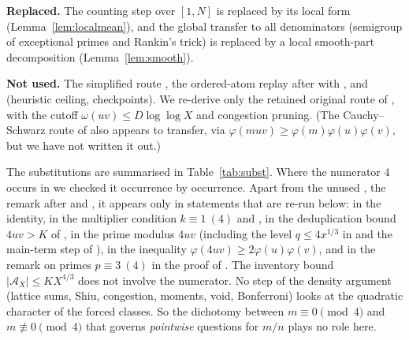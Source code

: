 \documentclass[10pt,reqno]{amsart}
\theoremstyle{definition}
\newcommand{\A}{\mathcal A}
\begin{document}
\noindent\textbf{Replaced.}  The counting step \cite[(50)]{TQ} over
$[1,N]$ is replaced by its local form (Lemma~\ref{lem:localmean}), and
the global transfer to all denominators \cite[\S9]{TQ} (semigroup of
exceptional primes and Rankin's trick) is replaced by a local smooth-part
decomposition (Lemma~\ref{lem:smooth}).

\noindent\textbf{Not used.}  The simplified route \cite[\S5]{TQ}, the
ordered-atom replay after \cite[Theorem~6.3]{TQ} with
\cite[Lemmas~6.1, 6.2]{TQ}, and \cite[\S\S10--11]{TQ} (heuristic ceiling,
checkpoints).  We re-derive only the retained original route of
\cite{TQ}, with the cutoff $\omega(uv)\leq D\log\log X$ and congestion
pruning.  (The Cauchy--Schwarz route of \cite[\S5]{TQ} also appears to
transfer, via $\varphi(muv)\geq\varphi(m)\varphi(u)\varphi(v)$, but we
have not written it out.)

\smallskip
The substitutions are summarised in Table~\ref{tab:subst}.  Where the
numerator $4$ occurs in \cite{TQ} we checked it occurrence by occurrence.
Apart from the unused \cite[\S5]{TQ}, the remark after \cite[(21)]{TQ}
and \cite[\S\S10--11]{TQ}, it appears only in statements that are re-run
below: in the identity, in the multiplier condition $k\equiv1\ (4)$ and
\cite[Lemma~3.2]{TQ}, in the deduplication bound $4uv>K$ of
\cite[Lemma~2.2]{TQ}, in the prime modulus $4uv$ (including the level
$q\leq4x^{1/3}$ in \cite[(8), (9)]{TQ} and the main-term step of
\cite[Theorem~4.2]{TQ}), in the inequality
$\varphi(4uv)\geq2\varphi(u)\varphi(v)$, and in the remark on primes
$p\equiv3\ (4)$ in the proof of \cite[Lemma~7.1]{TQ}.  The inventory bound
$|\A_X|\leq KX^{4/3}$ does not involve the numerator.  No step of the
density argument (lattice sums, Shiu, congestion, moments, void,
Bonferroni) looks at the quadratic character of the forced classes.  So
the dichotomy between $m\equiv0\pmod 4$ and $m\not\equiv0\pmod4$ that
governs \emph{pointwise} questions for $m/n$ \cite[\S15]{SUBEXP} plays no
role here.
\end{document}
